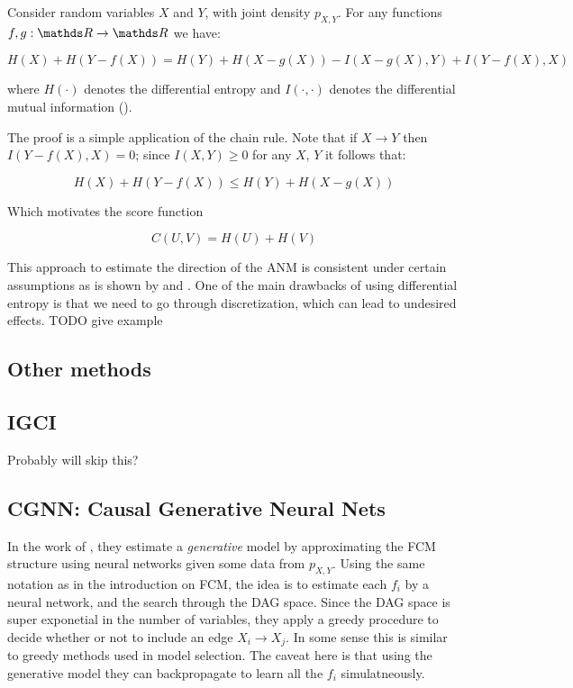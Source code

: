 \begin{lemma} Consider random variables $X$ and $Y$, with joint density $p_{X, Y}$. For any functions 
$f, g : \R \rightarrow \R$ we have:

$$
    H(X) + H(Y - f(X)) = H(Y) + H(X - g(X)) - I(X - g(X), Y) + I(Y - f(X), X)
$$

where $H(\cdot)$ denotes the differential entropy and $I(\cdot, \cdot)$ denotes the differential mutual information 
(\cite{cover1999elements}).
\end{lemma}

The proof is a simple application of the chain rule. Note that if $X \rightarrow Y$ then $I(Y - f(X), X) = 0$; 
since $I(X, Y) \geq 0$ for any $X$, $Y$ it follows
that:

$$
    H(X) + H(Y - f(X)) \leq  H(Y) + H(X - g(X))
$$

Which motivates the score function

$$
    C(U, V) = H(U) + H(V)
$$

This approach to estimate the direction of the ANM is consistent under certain assumptions as is shown by 
\cite{kpotufe2014consistency} and \cite{nowzohour2016score}. One of the main drawbacks of using differential
entropy is that we need to go through discretization, which can lead to undesired effects.
TODO give example 


\subsection{Other methods}

\subsection{IGCI}

Probably will skip this?


\subsection{CGNN: Causal Generative Neural Nets}

In the work of \cite{goudet2017causal}, they estimate a \textit{generative} model by approximating
the FCM structure using neural networks given some data from $p_{X, Y}$. Using the same notation
as in the introduction on FCM, the idea is to estimate each $f_i$ by a neural network, and the 
search through the DAG space. Since the DAG space is super exponetial in the number of variables,
they apply a greedy procedure to decide whether or not to include an edge $X_i \rightarrow X_j$.
In some sense this is similar to greedy methods used in model selection. The caveat here is that
using the generative model they can backpropagate to learn all the $f_i$ simulatneously. 

